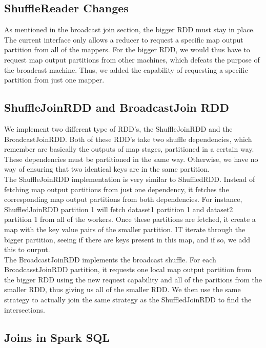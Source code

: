 \subsection{ShuffleReader Changes}

As mentioned in the broadcast join section, the bigger RDD must stay in place. The current interface only allows a reducer to request a specific map output partition
 from all of the mappers. For the bigger RDD, we would thus have to request map output partitions from other machines, which defeats the purpose of the broadcast machine. Thus, we added the capability of requesting a specific partition from just one mapper. 

\subsection{ShuffleJoinRDD and BroadcastJoin RDD}

We implement two different type of RDD's, the ShuffleJoinRDD and the
BroadcastJoinRDD. Both of these RDD's take two shuffle dependencies, which remember
are basically the outputs of map stages, partitioned in a certain way. These 
dependencies must be partitioned in the same way. Otherwise, we have no way
of ensuring that two identical keys are in the same partition.  
\\

The ShuffleJoinRDD implementation is very similar to ShuffledRDD. Instead of fetching map output partitions
from just one dependency, it fetches the corresponding map output partitions from both dependencies.   
For instance, ShuffledJoinRDD partition 1 will fetch dataset1 partition 1 and dataset2
partition 1 from all of the workers. Once these partitions are fetched, it create a map with the key value pairs of the smaller partition.
IT iterate through the bigger partition, seeing if there are keys present in this map, and if so, we add this to ourput.\\

The BroadcastJoinRDD implements the broadcast shuffle.
For each BroadcasstJoinRDD partition, it requests one local map output partition from the bigger RDD using the new request capability and  
all of the paritions from the smaller RDD, thus giving us all of the smaller RDD. We then use the same strategy
to actually join the same strategy as the ShuffledJoinRDD to find the intersections.

\subsection{Joins in Spark SQL}

